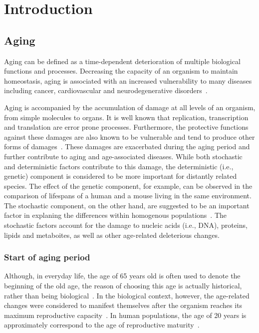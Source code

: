 \chapter{Introduction}
\label{chp:b1}

\section{Aging}
Aging can be defined as a time-dependent deterioration of multiple biological functions and processes.
Decreasing the capacity of an organism to maintain homeostasis, 
aging is associated with an increased vulnerability to many diseases including cancer, cardiovascular and neurodegenerative disorders~\cite{Niccoli2012}.

Aging is accompanied by the accumulation of damage at all levels of an organism, from simple molecules to organs.
It is well known that replication, transcription and translation are error prone processes.
Furthermore, the protective functions against these damages are also known to be vulnerable and tend to produce other forms of damages~\cite{Gladyshev2016}.
These damages are exacerbated during the aging period and further contribute to aging and age-associated diseases.
While both stochastic and deterministic factors contribute to this damage, 
the deterministic (i.e., genetic) component is considered to be more important for distantly related species.
The effect of the genetic component, for example, can be observed in the comparison of lifespans of a human and a mouse living in the same environment.
The stochastic component, on the other hand, are suggested to be an important factor in explaning the differences within homogenous populations~\cite{Gladyshev2016}.
The stochastic factors account for the damage to nucleic acids (i.e., DNA), proteins, lipids and metaboites, as well as other age-related deleterious changes.

\subsection{Start of aging period}
Although, in everyday life, the age of 65 years old is often used to denote the beginning of the old age, the reason of choosing this age is actually historical, rather than being biological~\cite{Covey1992}.
In the biological context, however, the age-related changes were considered to manifest themselves after the organism reaches its maximum reproductive capacity~\cite{Vijg2009}.
In human populations, the age of 20 years is approximately correspond to the age of reproductive maturity~\cite{Walker2006}.

